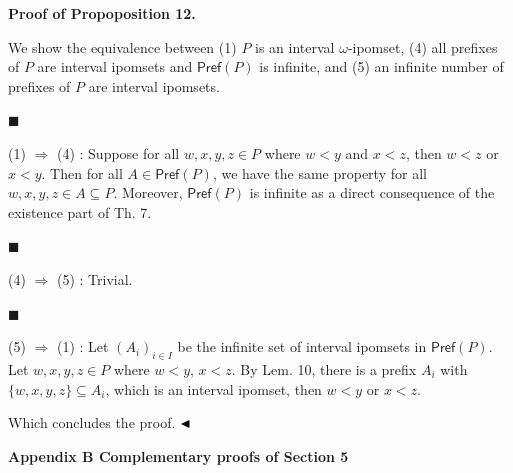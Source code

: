 \documentclass[10pt,a4paper]{article}
\begin{document}
\par\medskip\noindent\textbf{Proof of Propoposition 12.}\par
 
 
We show the equivalence between (1) $P$ is an interval $\omega$-ipomset, (4) all prefixes of $P$ are interval ipomsets and $\mathsf{Pref}(P)$ is infinite, and (5) an infinite number of prefixes of $P$ are interval ipomsets.\par
  
\par\noindent  $\blacksquare$ 
 
(1) $\Rightarrow$ (4) : Suppose for all $w,x,y,z\in P$ where $w<y$ and $x<z$, then $w<z$ or $x<y$. Then for all $A\in\mathsf{Pref}(P)$, we have the same property for all $w,x,y,z\in A\subseteq P$. Moreover, $\mathsf{Pref}(P)$ is infinite as a direct consequence of the existence part of Th. 7.\par
 
 
 
\par\noindent  $\blacksquare$ 
 
(4) $\Rightarrow$ (5) : Trivial.\par
 
 
 
\par\noindent  $\blacksquare$ 
 
(5) $\Rightarrow$ (1) : Let $(A_{i})_{i\in I}$ be the infinite set of interval ipomsets in $\mathsf{Pref}(P)$. Let $w,x,y,z\in P$ where $w<y$, $x<z$. By Lem. 10, there is a prefix $A_{i}$ with ${\{w,x,y,z\}}\subseteq A_{i}$, which is an interval ipomset, then $w<y$ or $x<z$.\par
 
 
  
Which concludes the proof. $\hfill\blacktriangleleft$\par
 
 
 


 
\par\medskip\noindent\textbf{Appendix B Complementary proofs of Section 5}\par
 
 
\end{document}
